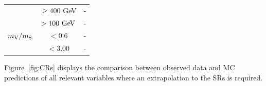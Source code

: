 \begin{table}[htpb]
\begin{center}
\begin{tabular}{lccc}
		      \pTISR               & $\ge 400$ GeV  & \multicolumn{2}{c}{-}                 \\ %
		      \mS                  & $>100\gev$     & \multicolumn{2}{c}{-}                 \\ %
		      $m_{\mathrm{V}}/m_{\mathrm{S}}$            & $<0.6$         & \multicolumn{2}{c}{-}                 \\ %
		      \dPhiISRMET          & $<3.00$        & \multicolumn{2}{c}{-}                 \\ %
		      \bottomrule
		    \end{tabular}
		  \end{center}
		  \label{tab:VRTCDEDef}
		\end{table}



		Figure~\ref{fig:CRs} displays the comparison between observed data and \ac{MC} predictions of all relevant variables where an extrapolation to the \acp{SR} is required.
